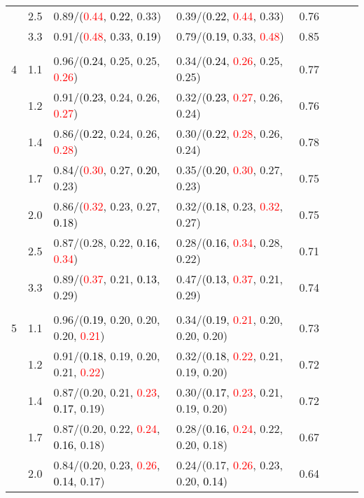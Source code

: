 \documentclass[10pt,a4paper]{report}
\begin{document}
\begin{table}[!htbp]
\begin{center}
{\begin{tabular}{ccllcccc}
			&2.5&0.89/(\textcolor{red}{0.44}, \textcolor{black}{0.22}, 0.33)&0.39/(\textcolor{black}{0.22}, \textcolor{red}{0.44}, 0.33)&0.76\\
			&3.3&0.91/(\textcolor{red}{0.48}, 0.33, \textcolor{black}{0.19})&0.79/(\textcolor{black}{0.19}, 0.33, \textcolor{red}{0.48})&0.85\\
			&&&&\\
			4			&1.1&0.96/(\textcolor{black}{0.24}, 0.25, 0.25, \textcolor{red}{0.26})&0.34/(\textcolor{black}{0.24}, \textcolor{red}{0.26}, 0.25, 0.25)&0.77\\
			&1.2&0.91/(\textcolor{black}{0.23}, 0.24, 0.26, \textcolor{red}{0.27})&0.32/(\textcolor{black}{0.23}, \textcolor{red}{0.27}, 0.26, 0.24)&0.76\\
			&1.4&0.86/(\textcolor{black}{0.22}, 0.24, 0.26, \textcolor{red}{0.28})&0.30/(\textcolor{black}{0.22}, \textcolor{red}{0.28}, 0.26, 0.24)&0.78\\
			&1.7&0.84/(\textcolor{red}{0.30}, 0.27, \textcolor{black}{0.20}, 0.23)&0.35/(\textcolor{black}{0.20}, \textcolor{red}{0.30}, 0.27, 0.23)&0.75\\
			&2.0&0.86/(\textcolor{red}{0.32}, 0.23, 0.27, \textcolor{black}{0.18})&0.32/(\textcolor{black}{0.18}, 0.23, \textcolor{red}{0.32}, 0.27)&0.75\\
			&2.5&0.87/(0.28, 0.22, \textcolor{black}{0.16}, \textcolor{red}{0.34})&0.28/(\textcolor{black}{0.16}, \textcolor{red}{0.34}, 0.28, 0.22)&0.71\\
			&3.3&0.89/(\textcolor{red}{0.37}, 0.21, \textcolor{black}{0.13}, 0.29)&0.47/(\textcolor{black}{0.13}, \textcolor{red}{0.37}, 0.21, 0.29)&0.74\\
			&&&&\\
			5			&1.1&0.96/(\textcolor{black}{0.19}, 0.20, 0.20, 0.20, \textcolor{red}{0.21})&0.34/(\textcolor{black}{0.19}, \textcolor{red}{0.21}, 0.20, 0.20, 0.20)&0.73\\
			&1.2&0.91/(\textcolor{black}{0.18}, 0.19, 0.20, 0.21, \textcolor{red}{0.22})&0.32/(\textcolor{black}{0.18}, \textcolor{red}{0.22}, 0.21, 0.19, 0.20)&0.72\\
			&1.4&0.87/(0.20, 0.21, \textcolor{red}{0.23}, \textcolor{black}{0.17}, 0.19)&0.30/(\textcolor{black}{0.17}, \textcolor{red}{0.23}, 0.21, 0.19, 0.20)&0.72\\
			&1.7&0.87/(0.20, 0.22, \textcolor{red}{0.24}, \textcolor{black}{0.16}, 0.18)&0.28/(\textcolor{black}{0.16}, \textcolor{red}{0.24}, 0.22, 0.20, 0.18)&0.67\\
			&2.0&0.84/(0.20, 0.23, \textcolor{red}{0.26}, \textcolor{black}{0.14}, 0.17)&0.24/(0.17, \textcolor{red}{0.26}, 0.23, 0.20, \textcolor{black}{0.14})&0.64\\

\end{tabular}}
\end{center}
\end{table}
\end{document}
